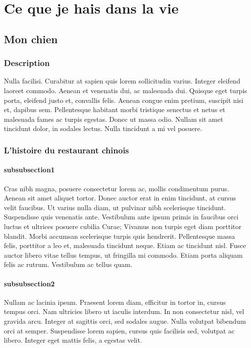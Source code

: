 \documentclass[a4paper]{report}
\begin{document}
\tableofcontents
\chapter{Ce que je hais dans la vie}
\section{Mon chien}
\subsection{Description}
Nulla facilisi. Curabitur at sapien quis lorem sollicitudin varius. Integer eleifend laoreet commodo. Aenean et venenatis dui, ac malesuada dui. Quisque eget turpis porta, eleifend justo et, convallis felis. Aenean congue enim pretium, suscipit nisi et, dapibus sem. Pellentesque habitant morbi tristique senectus et netus et malesuada fames ac turpis egestas. Donec ut massa odio. Nullam sit amet tincidunt dolor, in sodales lectus. Nulla tincidunt a mi vel posuere.


\subsection{L'histoire du restaurant chinois}
\subsubsection{subsubsection1}
Cras nibh magna, posuere consectetur lorem ac, mollis condimentum purus. Aenean sit amet aliquet tortor. Donec auctor erat in enim tincidunt, at cursus velit faucibus. Ut varius nulla diam, ut pulvinar nibh scelerisque tincidunt. Suspendisse quis venenatis ante. Vestibulum ante ipsum primis in faucibus orci luctus et ultrices posuere cubilia Curae; Vivamus non turpis eget diam porttitor blandit. Morbi accumsan scelerisque turpis quis hendrerit. Pellentesque massa felis, porttitor a leo et, malesuada tincidunt neque. Etiam ac tincidunt nisl. Fusce auctor libero vitae tellus tempus, ut fringilla mi commodo. Etiam porta aliquam felis ac rutrum. Vestibulum ac tellus quam.
\subsubsection{subsubsection2}
Nullam ac lacinia ipsum. Praesent lorem diam, efficitur in tortor in, cursus tempus orci. Nam ultricies libero ut iaculis interdum. In non consectetur nisl, vel gravida arcu. Integer at sagittis orci, sed sodales augue. Nulla volutpat bibendum orci at semper. Suspendisse lorem sapien, cursus quis facilisis sed, volutpat ac libero. Integer eget mattis felis, a egestas velit.
\end{document}

